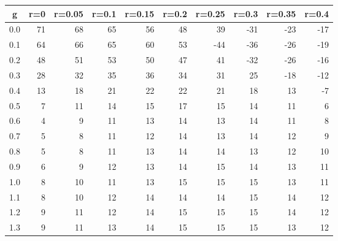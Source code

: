 %
\begin{table}[!tbp]
 \begin{center}
 \begin{tabular}{rrrrrrrrrr}\hline\hline
\multicolumn{1}{c}{g}&\multicolumn{1}{c}{r=0}&\multicolumn{1}{c}{r=0.05}&\multicolumn{1}{c}{r=0.1}&\multicolumn{1}{c}{r=0.15}&\multicolumn{1}{c}{r=0.2}&\multicolumn{1}{c}{r=0.25}&\multicolumn{1}{c}{r=0.3}&\multicolumn{1}{c}{r=0.35}&\multicolumn{1}{c}{r=0.4}\tabularnewline
\hline
0.0&71&68&65&56&48& 39&-31&-23&-17\tabularnewline
0.1&64&66&65&60&53&-44&-36&-26&-19\tabularnewline
0.2&48&51&53&50&47& 41&-32&-26&-16\tabularnewline
0.3&28&32&35&36&34& 31& 25&-18&-12\tabularnewline
0.4&13&18&21&22&22& 21& 18& 13& -7\tabularnewline
0.5& 7&11&14&15&17& 15& 14& 11&  6\tabularnewline
0.6& 4& 9&11&13&14& 13& 14& 11&  8\tabularnewline
0.7& 5& 8&11&12&14& 13& 14& 12&  9\tabularnewline
0.8& 5& 8&11&13&14& 14& 13& 12& 10\tabularnewline
0.9& 6& 9&12&13&14& 15& 14& 13& 11\tabularnewline
1.0& 8&10&11&13&15& 15& 15& 13& 11\tabularnewline
1.1& 8&10&12&14&14& 14& 15& 14& 12\tabularnewline
1.2& 9&11&12&14&15& 15& 15& 14& 12\tabularnewline
1.3& 9&11&13&14&15& 15& 15& 13& 12\tabularnewline
\hline
\end{tabular}

\end{center}

\end{table}

